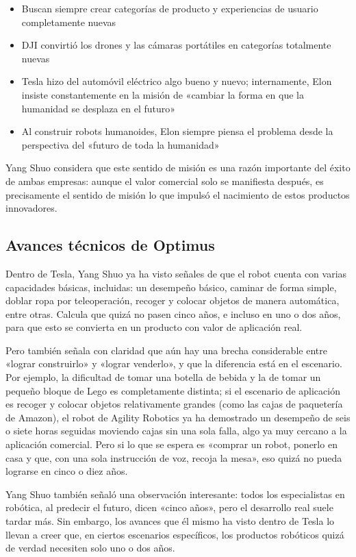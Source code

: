\documentclass[a4paper]{article}
\begin{document}
\begin{itemize}
    \item Buscan siempre crear categorías de producto y experiencias de usuario completamente nuevas
    \item DJI convirtió los drones y las cámaras portátiles en categorías totalmente nuevas
    \item Tesla hizo del automóvil eléctrico algo bueno y nuevo; internamente, Elon insiste constantemente en la misión de «cambiar la forma en que la humanidad se desplaza en el futuro»
    \item Al construir robots humanoides, Elon siempre piensa el problema desde la perspectiva del «futuro de toda la humanidad»
\end{itemize}

Yang Shuo considera que este sentido de misión es una razón importante del éxito de ambas empresas: aunque el valor comercial solo se manifiesta después, es precisamente el sentido de misión lo que impulsó el nacimiento de estos productos innovadores.

\subsection{Avances técnicos de Optimus}

Dentro de Tesla, Yang Shuo ya ha visto señales de que el robot cuenta con varias capacidades básicas, incluidas: un desempeño básico, caminar de forma simple, doblar ropa por teleoperación, recoger y colocar objetos de manera automática, entre otras. Calcula que quizá no pasen cinco años, e incluso en uno o dos años, para que esto se convierta en un producto con valor de aplicación real.

Pero también señala con claridad que aún hay una brecha considerable entre «lograr construirlo» y «lograr venderlo», y que la diferencia está en el escenario. Por ejemplo, la dificultad de tomar una botella de bebida y la de tomar un pequeño bloque de Lego es completamente distinta; si el escenario de aplicación es recoger y colocar objetos relativamente grandes (como las cajas de paquetería de Amazon), el robot de Agility Robotics ya ha demostrado un desempeño de seis o siete horas seguidas moviendo cajas sin una sola falla, algo ya muy cercano a la aplicación comercial. Pero si lo que se espera es «comprar un robot, ponerlo en casa y que, con una sola instrucción de voz, recoja la mesa», eso quizá no pueda lograrse en cinco o diez años.

Yang Shuo también señaló una observación interesante: todos los especialistas en robótica, al predecir el futuro, dicen «cinco años», pero el desarrollo real suele tardar más. Sin embargo, los avances que él mismo ha visto dentro de Tesla lo llevan a creer que, en ciertos escenarios específicos, los productos robóticos quizá de verdad necesiten solo uno o dos años.
\end{document}

